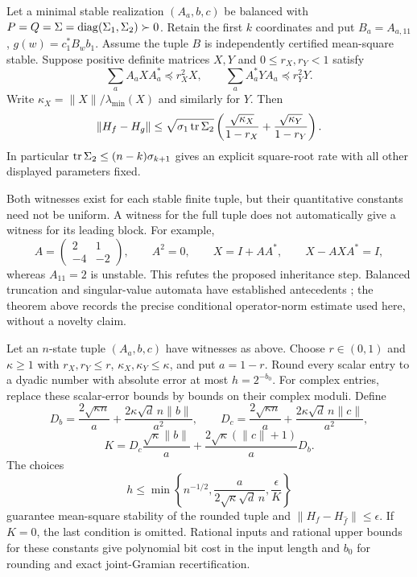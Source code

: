\begin{theorem}
\label{I:U:thm:quantitative-truncation}
Let a minimal stable realization $(A_a,b,c)$ be balanced with
$P=Q=\Sigma=\operatorname{diag}(\Sigma_1,\Sigma_2)\succ0$. Retain the first $k$
coordinates and put $B_a=A_{a,11}$, $g(w)=c_1^*B_wb_1$.
Assume the tuple $B$ is independently certified mean-square stable.
Suppose positive definite matrices $X,Y$ and $0\le r_X,r_Y<1$ satisfy
\[
 \sum_a A_aXA_a^*\preceq r_X^2X,\qquad
 \sum_a A_a^*YA_a\preceq r_Y^2Y.
\]
Write $\kappa_X=\|X\|/\lambda_{\min}(X)$ and similarly for $Y$.
Then
\begin{equation}
 \|H_f-H_g\|\le\sqrt{\sigma_1\operatorname{tr}\Sigma_2}
 \left(\frac{\sqrt{\kappa_X}}{1-r_X}
             +\frac{\sqrt{\kappa_Y}}{1-r_Y}\right).
 \label{I:U:eq:quantitative-truncation}
\end{equation}
In particular $\operatorname{tr}\Sigma_2\le(n-k)\sigma_{k+1}$ gives an explicit
square-root rate with all other displayed parameters fixed.
\end{theorem}

Both witnesses exist for each stable finite tuple, but their quantitative
constants need not be uniform. A witness for the full tuple does not
automatically give a witness for its leading block. For example,
\[
 A=\begin{pmatrix}2&1\\-4&-2\end{pmatrix},\qquad A^2=0,
 \qquad X=I+AA^*,\qquad X-AXA^*=I,
\]
whereas $A_{11}=2$ is unstable. This refutes the proposed inheritance
step. Balanced truncation and singular-value automata have established
antecedents \citep{sva2019}; the theorem above records the precise
conditional operator-norm estimate used here, without a novelty claim.

\begin{theorem}
\label{I:U:thm:explicit-dyadic}
Let an $n$-state tuple $(A_a,b,c)$ have witnesses as above. Choose
$r\in(0,1)$ and $\kappa\ge1$ with
$r_X,r_Y\le r$, $\kappa_X,\kappa_Y\le\kappa$, and put $a=1-r$.
Round every scalar entry to a dyadic number with absolute error at most
$h=2^{-b_0}$. For complex entries, replace these scalar-error bounds
by bounds on their complex moduli. Define
\[
 D_b=\frac{2\sqrt{\kappa n}}a+
                  \frac{2\kappa\sqrt d\,n\|b\|}{a^2},\qquad
 D_c=\frac{2\sqrt{\kappa n}}a+
                  \frac{2\kappa\sqrt d\,n\|c\|}{a^2},
\]
\[
 K= D_c\frac{\sqrt\kappa\|b\|}a
       +\frac{2\sqrt\kappa(\|c\|+1)}a D_b.
\]
The choices
\begin{equation}
 h\le\min\left\{n^{-1/2},
       \frac{a}{2\sqrt\kappa\sqrt d\,n},\frac\epsilon K\right\}
 \label{I:U:eq:explicit-dyadic}
\end{equation}
guarantee mean-square stability of the rounded tuple and
$\|H_f-H_{\widehat f}\|\le\epsilon$.
If $K=0$, the last condition is omitted. Rational inputs and rational
upper bounds for these constants give polynomial bit cost in the input
length and $b_0$ for rounding and exact joint-Gramian recertification.
\end{theorem}


